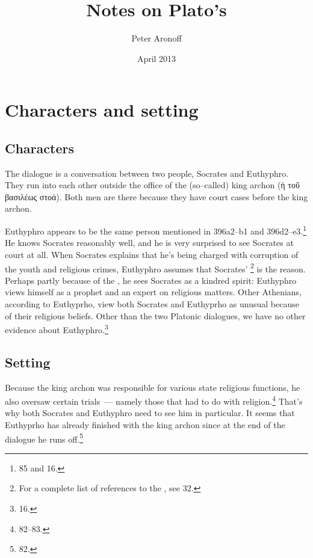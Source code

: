 \documentclass[10pt]{article}
\begin{document}
\begin{titlepage}
\title{Notes on Plato's }
\author{Peter Aronoff}
\date{April 2013}
\maketitle
\end{titlepage}

\section{Characters and setting}

\subsection{Characters}

The dialogue is a conversation between two people, Socrates and Euthyphro.
They run into each other outside the office of the (so--called) king archon
(ἡ τοῦ βασιλέως στοά).  Both men are there because they have court cases
before the king archon.

Euthyphro appears to be the same person mentioned in 
396a2--b1 and 396d2--e3.\footnote{\citet{burnet1924} 85 and
\citet{bailly2003} 16.}  He knows Socrates reasonably well, and he is very
surprised to see Socrates at court at all.  When Socrates explains that he's
being charged with corruption of the youth and religious crimes, Euthyphro
assumes that Socrates' \footnote{For a complete list of
references to the , see \citet{bailly2003} 32.}
is the reason.  Perhaps partly because of the , he sees
Socrates as a kindred spirit: Euthyphro views himself as a prophet and an
expert on religious matters.  Other Athenians, according to Euthyprho, view
both Socrates and Euthyprho as unusual because of their religious beliefs.
Other than the two Platonic dialogues, we have no other evidence about
Euthyphro.\footnote{\citet{bailly2003} 16.}

\subsection{Setting}

Because the king archon was responsible for various state religious
functions, he also oversaw certain trials~--- namely those that had to do
with religion.\footnote{\citet{burnet1924} 82--83.}  That's why both
Socrates and Euthyphro need to see him in particular.  It seems that
Euthyprho has already finished with the king archon since at the end of the
dialogue he runs off.\footnote{\citet{burnet1924} 82.}
\end{document}
